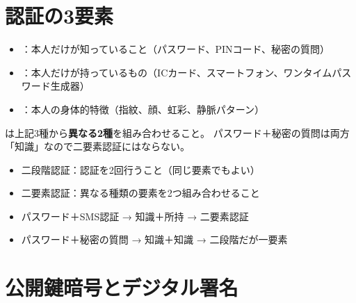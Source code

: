 \section{認証の3要素}

\begin{teigi}[認証の3要素]
\begin{itemize}
  \item {}：本人だけが知っていること（パスワード、PINコード、秘密の質問）
  \item {}：本人だけが持っているもの（ICカード、スマートフォン、ワンタイムパスワード生成器）
  \item {}：本人の身体的特徴（指紋、顔、虹彩、静脈パターン）
\end{itemize}
は上記3種から\textbf{異なる2種}を組み合わせること。
パスワード＋秘密の質問は両方「知識」なので二要素認証にはならない。
\end{teigi}

\begin{pitfall}
\begin{itemize}
  \item 二段階認証：認証を2回行うこと（同じ要素でもよい）
  \item 二要素認証：異なる種類の要素を2つ組み合わせること
  \item パスワード＋SMS認証 → 知識＋所持 → 二要素認証
  \item パスワード＋秘密の質問 → 知識＋知識 → 二段階だが一要素
\end{itemize}
\end{pitfall}

\section{公開鍵暗号とデジタル署名}

\begin{hikaku}[共通鍵暗号と公開鍵暗号]
\end{hikaku}

